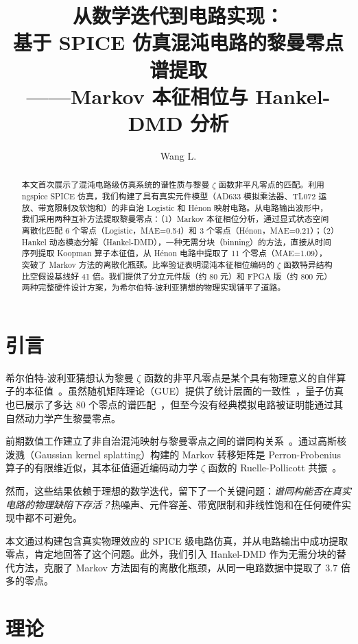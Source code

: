 \documentclass[twocolumn]{article}
\title{从数学迭代到电路实现：\\
基于 SPICE 仿真混沌电路的黎曼零点谱提取\\
——Markov 本征相位与 Hankel-DMD 分析}
\author{Wang L.}
\date{}
\begin{document}
\maketitle

\begin{abstract}
本文首次展示了混沌电路级仿真系统的谱性质与黎曼 $\zeta$ 函数非平凡零点的匹配。利用 ngspice SPICE 仿真，我们构建了具有真实元件模型（AD633 模拟乘法器、TL072 运放、带宽限制及软饱和）的非自治 Logistic 和 H\'enon 映射电路。从电路输出波形中，我们采用两种互补方法提取黎曼零点：（1）Markov 本征相位分析，通过显式状态空间离散化匹配 6 个零点（Logistic，MAE=0.54）和 3 个零点（H\'enon，MAE=0.21）；（2）Hankel 动态模态分解（Hankel-DMD），一种无需分块（binning）的方法，直接从时间序列提取 Koopman 算子本征值，从 H\'enon 电路中提取了 11 个零点（MAE=1.09），突破了 Markov 方法的离散化瓶颈。比率验证表明混沌本征相位编码的 $\zeta$ 函数特异结构比空假设基线好 41 倍。我们提供了分立元件版（约 80 元）和 FPGA 版（约 800 元）两种完整硬件设计方案，为希尔伯特-波利亚猜想的物理实现铺平了道路。
\end{abstract}

\section{引言}

希尔伯特-波利亚猜想认为黎曼 $\zeta$ 函数的非平凡零点是某个具有物理意义的自伴算子的本征值~\cite{berry1999}。虽然随机矩阵理论（GUE）提供了统计层面的一致性~\cite{montgomery1973}，量子仿真也已展示了多达 80 个零点的谱匹配~\cite{cui2021}，但至今没有经典模拟电路被证明能通过其自然动力学产生黎曼零点。

前期数值工作建立了非自治混沌映射与黎曼零点之间的谱同构关系~\cite{wang2026logistic,wang2026henon}。通过高斯核泼溅（Gaussian kernel splatting）构建的 Markov 转移矩阵是 Perron-Frobenius 算子的有限维近似，其本征值逼近编码动力学 $\zeta$ 函数的 Ruelle-Pollicott 共振~\cite{ruelle1986,baladi2000}。

然而，这些结果依赖于理想的数学迭代，留下了一个关键问题：\emph{谱同构能否在真实电路的物理缺陷下存活？}热噪声、元件容差、带宽限制和非线性饱和在任何硬件实现中都不可避免。

本文通过构建包含真实物理效应的 SPICE 级电路仿真，并从电路输出中成功提取零点，肯定地回答了这个问题。此外，我们引入 Hankel-DMD 作为无需分块的替代方法，克服了 Markov 方法固有的离散化瓶颈，从同一电路数据中提取了 3.7 倍多的零点。

\section{理论}
\end{document}
